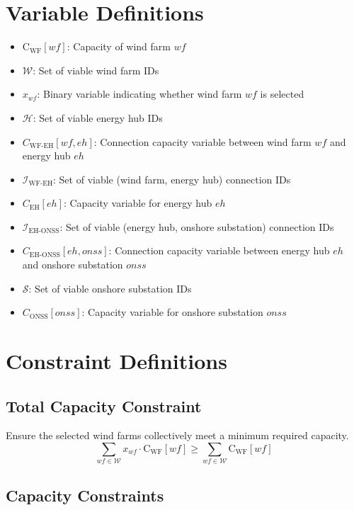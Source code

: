 \section*{Variable Definitions}

\begin{itemize}
    \item \( \text{C}_{\text{WF}}[wf] \): Capacity of wind farm \( wf \)
    \item \( \mathcal{W} \): Set of viable wind farm IDs
    \item \( x_{wf} \): Binary variable indicating whether wind farm \( wf \) is selected
    \item \( \mathcal{H} \): Set of viable energy hub IDs
    \item \( C_{\text{WF-EH}}[wf, eh] \): Connection capacity variable between wind farm \( wf \) and energy hub \( eh \)
    \item \( \mathcal{I}_{\text{WF-EH}} \): Set of viable (wind farm, energy hub) connection IDs
    \item \( C_{\text{EH}}[eh] \): Capacity variable for energy hub \( eh \)
    \item \( \mathcal{I}_{\text{EH-ONSS}} \): Set of viable (energy hub, onshore substation) connection IDs
    \item \( C_{\text{EH-ONSS}}[eh, onss] \): Connection capacity variable between energy hub \( eh \) and onshore substation \( onss \)
    \item \( \mathcal{S} \): Set of viable onshore substation IDs
    \item \( C_{\text{ONSS}}[onss] \): Capacity variable for onshore substation \( onss \)
\end{itemize}

\section*{Constraint Definitions}

\subsection*{Total Capacity Constraint}
Ensure the selected wind farms collectively meet a minimum required capacity.
\begin{equation}
    \sum_{wf \in \mathcal{W}} x_{wf} \cdot \text{C}_{\text{WF}}[wf] \geq \sum_{wf \in \mathcal{W}} \text{C}_{\text{WF}}[wf]
\end{equation}

\subsection*{Capacity Constraints}
